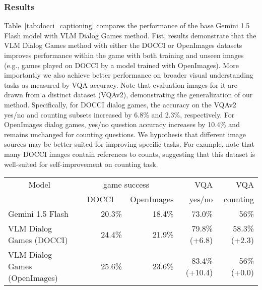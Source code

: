 \subsubsection{Results}

Table~\ref{tab:docci_captioning} compares the performance of the base Gemini 1.5 Flash model with VLM Dialog Games method.
Fist, results demonstrate that the VLM Dialog Games method with either the DOCCI or OpenImages datasets improves performance within the game with both training and unseen images (e.g., games played on DOCCI by a model trained with OpenImages).
More importantly we also achieve better performance on broader visual understanding tasks as measured by VQA accuracy.
Note that evaluation images for it are drawn from a distinct dataset (VQAv2), demonstrating the generalization of our method.
Specifically, for DOCCI dialog games, the accuracy on the VQAv2 yes/no and counting subsets increased by \num{6.8}\% and \num{2.3}\%, respectively.
For OpenImages dialog games, yes/no question accuracy increases by \num{10.4}\% and remains unchanged for counting questions. 
We hypothesis that different image sources may be better suited for improving specific tasks.
For example, \citet{OnoeDocci2024} note that many DOCCI images contain references to counts, suggesting that this dataset is well-suited for self-improvement on counting task.

\begin{table*}[h]
    \centering
     \caption{\textbf{Comparison of VLM Dialog Games and the initial Gemini 1.5 Flash.} Fine-tuning on dialog game data improves both game success rate and VQA performance (yes/no and counting subsets).  Results demonstrate generalization across training and evaluation datasets.}
    \vspace{5mm}
    \begin{tabular}{l|r|r|r|r}
      \multicolumn{1}{c}{Model} & \multicolumn{2}{c}{game success} & VQA  & VQA \\
       & ~~DOCCI~~ & OpenImages & yes/no & counting \\
      \midrule
      Gemini 1.5 Flash & 20.3\%  & 18.4\% & 73.0\% & 56\% \\
      VLM Dialog Games (DOCCI) & 24.4\% & 21.9\% & 79.8\% (+6.8) & 58.3\% (+2.3) \\
      VLM Dialog Games (OpenImages) & 25.6\% & 23.6\% & 83.4\% (+10.4) & 56\% (+0.0)\\
    \end{tabular}
    \label{tab:docci_captioning}
\end{table*}

